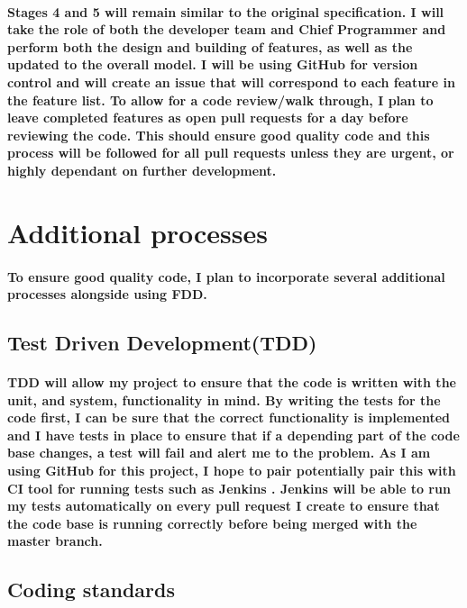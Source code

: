 \documentclass{article}
\begin{document}
\paragraph{Stages 4 and 5  will remain similar to the original specification. I will take the role of both the developer team and Chief Programmer and perform both the design and building of features, as well as the updated to the overall model. I will be using GitHub for version control and will create an issue that will correspond to each feature in the feature list. To allow for a code review/walk through, I plan to leave completed features as open pull requests for a day before reviewing the code. This should ensure good quality code and this process will be followed for all pull requests unless they are urgent, or highly dependant on further development.}

\newpage

\section{Additional processes}
\paragraph{To ensure good quality code, I plan to incorporate several additional processes alongside using FDD.}

\subsection{Test Driven Development(TDD)}
\paragraph{TDD will allow my project to ensure that the code is written with the unit, and system, functionality in mind. By writing the tests for the code first, I can be sure that the correct functionality is implemented and I have tests in place to ensure that if a depending part of the code base changes, a test will fail and alert me to the problem. As I am using GitHub for this project, I hope to pair potentially pair this with CI tool for running tests such as Jenkins \cite{jenkins}. Jenkins will be able to run my tests automatically on every pull request I create to ensure that the code base is running correctly before being merged with the master branch. 
}

\subsection{Coding standards}
\end{document}
